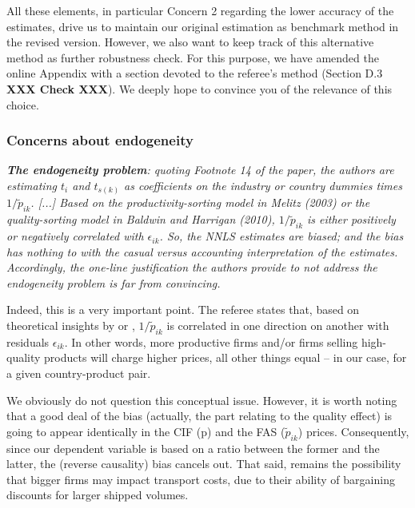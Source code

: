 \documentclass[a4paper,11pt]{article}
\begin{document}
\begin{itemize}
\begin{enumerate}
\begin{table}[htbp]
\begin{itemize}
\end{itemize}

All these elements, in particular Concern 2 regarding the lower accuracy of the estimates, drive us to maintain our original estimation as benchmark method in the revised version. However, we also want to keep track of this alternative method as further robustness check. For this purpose, we have amended the online Appendix with a section devoted to the referee's method (Section D.3 \textbf{XXX Check XXX}). We deeply hope to convince you of the relevance of this choice.



\subsubsection{Concerns about endogeneity}

\textit{\textbf{The endogeneity problem}: quoting Footnote 14 of the paper, the authors
are estimating $t_i$ and $t_{s(k)}$ as coefficients on the industry or country
dummies times $1/\widetilde{p}_{ik}$. [...] Based on the productivity-sorting model in Melitz (2003) or the quality-sorting
model in Baldwin and Harrigan (2010),  $1/\widetilde{p}_{ik}$ is either positively
or negatively correlated with $\epsilon_{ik}$. So, the NNLS estimates are biased; and
the bias has nothing to with the casual versus accounting interpretation of
the estimates. Accordingly, the one-line justification the authors provide
to not address the endogeneity problem is far from convincing.}

Indeed, this is a very important point. The referee states that, based on theoretical insights by \citet{melitz} or \citet{baldwin_harrigan}, $1/\widetilde{p}_{ik}$ is correlated in one direction on another with residuals $\epsilon_{ik}$. In other words, more productive firms and/or firms selling high-quality products will charge higher prices, all other things equal – in our case, for a given country-product pair.

We obviously do not question this conceptual issue. However, it is worth noting that a good deal of the bias (actually, the part relating to the quality effect) is going to appear identically in the CIF (p) and the FAS ($\widetilde{p}_{ik}$) prices. Consequently, since our dependent variable is based on a ratio between the former and the latter, the (reverse causality) bias cancels out. That said, remains the possibility that bigger firms may impact transport costs, due to their ability of bargaining discounts for larger shipped volumes.


\end{table}
\end{enumerate}
\end{itemize}
\end{document}
